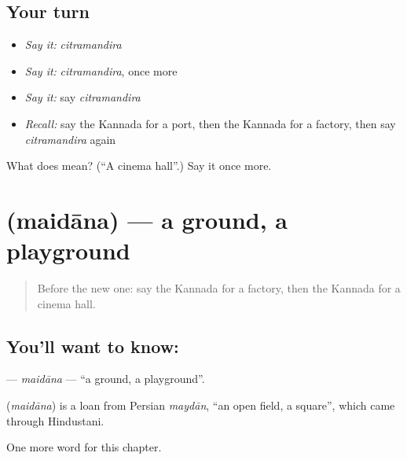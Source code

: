 \subsection*{Your turn}
\begin{itemize}
\raggedright
  \item \emph{Say it:} \emph{citramandira}
  \item \emph{Say it:} \emph{citramandira}, once more
  \item \emph{Say it:} say \emph{citramandira}
  \item \emph{Recall:} say the Kannada for a port, then the Kannada for a factory, then say \emph{citramandira} again
\end{itemize}

\begin{tcolorbox}[breakable,colback=teal!4,colframe=teal!35!black,title={Before you move on}]
What does  mean? (\textquotedblleft{}A cinema hall\textquotedblright{}.) Say it once more.
\end{tcolorbox}
\section[\texorpdfstring{\kn{ಮೈದಾನ} (maidāna)}{ಮೈದಾನ (maidāna)}]{ (maidāna) — a ground, a playground}

\label{lesson:KA-C212-maidana}



\begin{quote}
Before the new one: say the Kannada for a factory, then the Kannada for a cinema hall.
\end{quote}

\subsection*{You'll want to know: }
\textbf{} — \emph{maidāna} — \textquotedblleft{}a ground, a playground\textquotedblright{}.

\begin{cousinweb}
\textbf{} (\emph{maidāna}) is a loan from Persian \emph{maydān}, \textquotedblleft{}an open field, a square\textquotedblright{}, which came through Hindustani.
\end{cousinweb}

\begin{grammarlens}[title={What you've built}]
One more word for this chapter.
\end{grammarlens}

